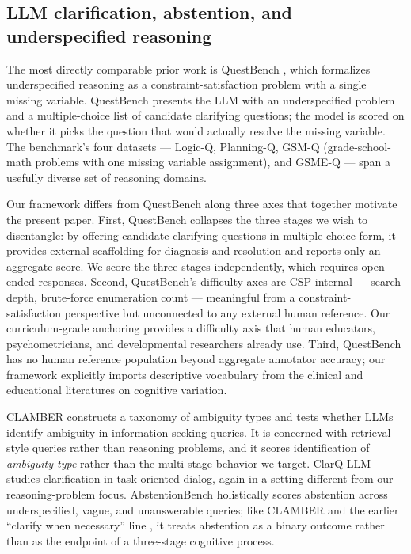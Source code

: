 \documentclass[11pt,letterpaper]{article}
\begin{document}
\subsection{LLM clarification, abstention, and underspecified reasoning}

The most directly comparable prior work is QuestBench \citep{li2025questbench}, which formalizes underspecified reasoning as a constraint-satisfaction problem with a single missing variable. QuestBench presents the LLM with an underspecified problem and a multiple-choice list of candidate clarifying questions; the model is scored on whether it picks the question that would actually resolve the missing variable. The benchmark's four datasets --- Logic-Q, Planning-Q, GSM-Q (grade-school-math problems with one missing variable assignment), and GSME-Q --- span a usefully diverse set of reasoning domains.

Our framework differs from QuestBench along three axes that together motivate the present paper. First, QuestBench collapses the three stages we wish to disentangle: by offering candidate clarifying questions in multiple-choice form, it provides external scaffolding for diagnosis and resolution and reports only an aggregate score. We score the three stages independently, which requires open-ended responses. Second, QuestBench's difficulty axes are CSP-internal --- search depth, brute-force enumeration count --- meaningful from a constraint-satisfaction perspective but unconnected to any external human reference. Our curriculum-grade anchoring provides a difficulty axis that human educators, psychometricians, and developmental researchers already use. Third, QuestBench has no human reference population beyond aggregate annotator accuracy; our framework explicitly imports descriptive vocabulary from the clinical and educational literatures on cognitive variation.

CLAMBER \citep{zhang2024clamber} constructs a taxonomy of ambiguity types and tests whether LLMs identify ambiguity in information-seeking queries. It is concerned with retrieval-style queries rather than reasoning problems, and it scores identification of \emph{ambiguity type} rather than the multi-stage behavior we target. ClarQ-LLM \citep{gan2024clarq} studies clarification in task-oriented dialog, again in a setting different from our reasoning-problem focus. AbstentionBench \citep{wen2025} holistically scores abstention across underspecified, vague, and unanswerable queries; like CLAMBER and the earlier ``clarify when necessary'' line \citep{zhang2023clarify}, it treats abstention as a binary outcome rather than as the endpoint of a three-stage cognitive process.
\end{document}
